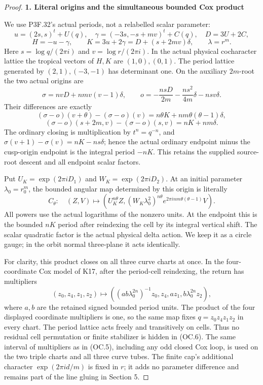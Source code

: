 \begin{proof}
\par

\medskip\noindent\textbf{1. Literal origins and the simultaneous bounded Cox product}

\par\nobreak

We use P3F.32's actual periods, not a relabelled scalar parameter:
\[
 u=(2s,s)^t+U(q),\quad
 \gamma=(-3s,-s+mv)^t+C(q),\quad D=3U+2C,
\]
\[
 H=-u-\gamma,\qquad K=3u+2\gamma=D+(s+2mv)\delta,
 \qquad \lambda=r^m.
 \tag{OC.3}
\]
Here \(s=\log q/(2 \pi i)\) and \(v=\log r/(2 \pi i)\). In the actual physical
cocharacter lattice the tropical vectors of \(H,K\) are \((1,0),(0,1)\).
The period lattice generated by \((2,1),(-3,-1)\) has determinant one.
On the auxiliary \(2m\)-root the two actual origins are
\[
 \sigma=nvD+nmv(v-1)\delta,\qquad
 o=-\frac{nsD}{2m}-\frac{ns^2}{4m}\delta-nsv\delta.
\]
Their differences are exactly
\[
 (\sigma-o)(v+\theta)- (\sigma-o)(v)
       =n\theta K+nm\theta(\theta-1)\delta,
\]
\[
 (\sigma-o)(s+2m,v)- (\sigma-o)(s,v)=nK+nm\delta.
 \tag{OC.4}
\]
The ordinary closing is multiplication by \(t^n=q^{-n}\), and
\(\sigma(v+1)-\sigma(v)=nK-ns \delta\); hence the actual ordinary endpoint
minus the cusp-origin endpoint is the integral period \(-nK\). This
retains the supplied source-root descent and all endpoint scalar factors.

Put \(U_K=\exp(2 \pi i D_1)\) and \(W_K=\exp(2 \pi i D_2)\). At an initial
parameter \(\lambda_0=r_0^m\), the bounded angular map determined by this
origin is literally
\[
 C_\theta:\quad
 (Z,V)\longmapsto
 \left(U_K^{n\theta}Z,
       (W_K\lambda_0^2)^{n\theta}
       e^{2\pi i nm\theta(\theta-1)}V\right).
 \tag{OC.5}
\]
All powers use the actual logarithms of the nonzero units. At the
endpoint this is the bounded \(nK\) period after reindexing the cell by its
integral vertical shift. The scalar quadratic factor is the actual
physical delta action. We keep it as a circle gauge; in the orbit normal
three-plane it acts identically.

For clarity, this product closes on all three curve charts at once.
In the four-coordinate Cox model of K17, after the period-cell reindexing,
the return has multipliers
\[
 (z_0,z_4,z_1,z_2)\longmapsto
 ((ab\lambda_0^{2n})^{-1}z_0,z_4,az_1,
                     b\lambda_0^{2n}z_2),
 \tag{OC.6}
\]
where \(a,b\) are the retained signed bounded period units. The product
of the four displayed coordinate multipliers is one, so the same map fixes \(q=z_0z_4z_1z_2\) in every chart. The
period lattice acts freely and transitively on cells. Thus no residual
cell permutation or finite stabilizer is hidden in (OC.6). The same
interval of multipliers as in (OC.5), including any odd closed Cox loop,
is used on the two triple charts and all three curve tubes. The finite
cap's additional character \(\exp(2 \pi i d/m)\) is fixed in \(r\); it adds no
parameter difference and remains part of the line gluing in Section 5.


\end{proof}
